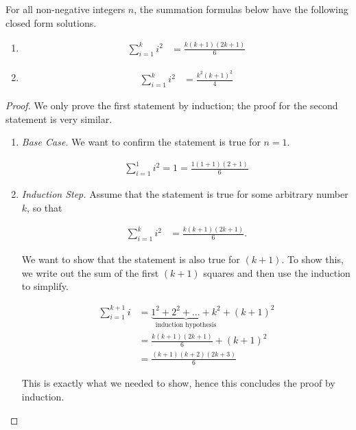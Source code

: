 \documentclass[twoside]{report}
\begin{document}
\vspace{\baselineskip}
\begin{theorem}
	For all non-negative integers $n$, the summation formulas below have the following closed form solutions.
	
	\begin{enumerate}
		\item 
		\begin{align}
			\sum_{i = 1}^k i^2 &= \frac{k(k + 1)(2k + 1)}{6}
		\end{align}

		\item 
		\begin{align}
			\sum_{i = 1}^k i^2 &= \frac{k^2(k + 1)^2}{4}
		\end{align}
	\end{enumerate}
\end{theorem}
\begin{proof}
	We only prove the first statement by induction; the proof for the second statement is very similar.
	
	\vspace{\baselineskip}
	\begin{enumerate}
		\item \emph{Base Case.} We want to confirm the statement is true for $n = 1$.
		
		\begin{align*}
			\sum_{i = 1}^1 i^2 = 1 = \frac{1 (1 + 1) (2 + 1)}{6}
		\end{align*}
		
		\item \emph{Induction Step.} Assume that the statement is true for some arbitrary number $k$, so that
		
		\begin{align*}
			\sum_{i = 1}^k i^2 &= \frac{k(k + 1)(2k + 1)}{6}.
		\end{align*}
		
		We want to show that the statement is also true for $(k + 1)$. To show this, we write out the sum of the first $(k + 1)$ squares and then use the induction to simplify.
						
		\begin{align*}
			\sum_{i = 1}^{k + 1} i &= \underbrace{1^2 + 2^2 + \dots + k^2}_\text{induction hypothesis} + (k + 1)^2  \\
			&= \frac{k(k + 1)(2k + 1)}{6} + (k + 1)^2 \\
			&= \frac{(k + 1)(k + 2)(2k + 3)}{6}
		\end{align*}
		
		This is exactly what we needed to show, hence this concludes the proof by induction.
	\end{enumerate}
\end{proof}
\vspace{\baselineskip}
\end{document}
